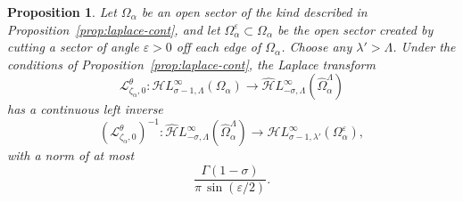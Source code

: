 \documentclass{article}
\newcommand{\singexp}[2]{\mathcal{H}L^\infty_{#1, #2}}
\newcommand{\dualsingexp}[2]{\widehat{\mathcal{H}}L^\infty_{#1, #2}}
\newcommand{\maps}{\colon}
\newcommand{\laplace}{\mathcal{L}}
\theoremstyle{definition}
\theoremstyle{plain}
\newtheorem{prop}[definition]{Proposition}
\begin{document}
\begin{prop}
Let $\Omega_\alpha$ be an open sector of the kind described in Proposition~\ref{prop:laplace-cont}, and let $\Omega_\alpha^\varepsilon \subset \Omega_\alpha$ be the open sector created by cutting a sector of angle $\varepsilon > 0$ off each edge of $\Omega_\alpha$. Choose any $\lambda' > \Lambda$. Under the conditions of Proposition~\ref{prop:laplace-cont}, the Laplace transform
\[ \laplace_{\zeta_\alpha, 0}^\theta \maps \singexp{\sigma-1}{\Lambda}(\Omega_\alpha) \to \dualsingexp{-\sigma}{\Lambda}(\widehat{\Omega}_\alpha^\Lambda) \]
has a continuous left inverse
\[ \left(\laplace_{\zeta_\alpha, 0}^\theta\right)^{-1} \maps \dualsingexp{-\sigma}{\Lambda}(\widehat{\Omega}_\alpha^\Lambda) \to \singexp{\sigma-1}{\lambda'}(\Omega_\alpha^\varepsilon), \]
with a norm of at most
\[ \frac{\Gamma(1-\sigma)}{\pi\,\sin(\varepsilon/2)}. \]
\end{prop}
\end{document}
